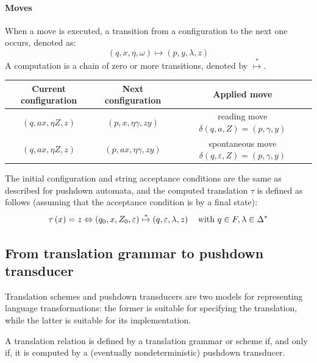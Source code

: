 \paragraph*{Moves}
When a move is executed, a transition from a configuration to the next one occurs, denoted as: 
\[ \left( q, x, \eta, \omega \right) \mapsto \left( p, y, \lambda, z \right)\]
A computation is a chain of zero or more transitions, denoted by $\overset{*}{\mapsto}$.
\begin{table}[H]
    \centering
    \begin{tabular}{c|c|c}
        \textbf{Current configuration}      & \textbf{Next configuration}               & \textbf{Applied move}                                                                           \\ \hline                                                                                                                                                                        
        $\left( q, ax, \eta Z, z \right)$   & $\left( p, x, \eta \gamma, z y \right)$   & reading move $\delta\left( q, a, Z \right) = \left( p, \gamma, y \right)$                       \\
        $\left( q, ax, \eta Z, z \right)$   & $\left( p, ax, \eta\gamma, zy \right)$    & spontaneous move $\delta\left( q, \varepsilon, Z \right) = \left( p, \gamma, y \right)$
    \end{tabular}
\end{table}
The initial configuration and string acceptance conditions are the same as described for pushdown automata, and the computed translation $\tau$ is defined as follows (assuming that the acceptance condition is by a final state):
\[ \tau\left( x \right) = z \Leftrightarrow \left( q_0, x, Z_0, \varepsilon \right) \overset{*}{\mapsto} \left( q, \varepsilon, \lambda, z \right) \quad \textnormal{with } q \in F, \lambda \in \Delta^{*} \]

\subsection{From translation grammar to pushdown transducer}
Translation schemes and pushdown transducers are two models for representing language transformations: the former is suitable for specifying the translation, while the latter is suitable for its implementation.
\begin{property}
    A translation relation is defined by a translation grammar or scheme if, and only if, it is computed by a (eventually nondeterministic) pushdown transducer.
\end{property}

